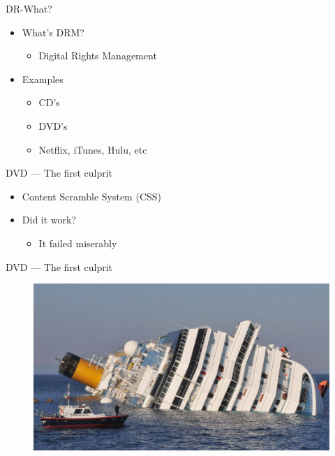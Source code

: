 \documentclass{beamer}
\begin{document}
\begin{frame}{DR-What?}
	\begin{itemize}
		\item What's DRM?\@\pause{}
		      \begin{itemize}
			      \item Digital Rights Management\pause{}
		      \end{itemize}
		\item Examples
		      \begin{itemize}
			      \item CD's \pause{}
			      \item DVD's \pause{}
			      \item Netflix, iTunes, Hulu, etc
		      \end{itemize}
	\end{itemize}
\end{frame}

\begin{frame}[t]{DVD --- The first culprit}
	\begin{itemize}
		\item Content Scramble System (CSS)\pause{}
		\item Did it work?
		      \begin{itemize}
			      \item \pause{}It failed miserably
		      \end{itemize}
    \end{itemize}
    \vfill
\end{frame}

\begin{frame}{DVD --- The first culprit}
	\begin{figure}
		\includegraphics[width=\textwidth]{fail1.jpg}
	\end{figure}
\end{frame}
\end{document}
